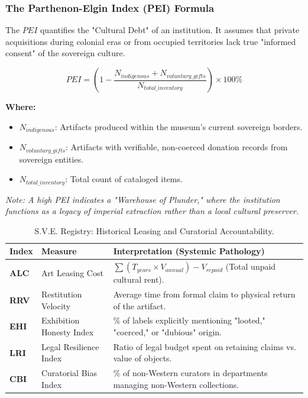\documentclass[11pt,a4paper]{article}
\theoremstyle{definition}
\theoremstyle{remark}
\begin{document}
\subsubsection*{The Parthenon-Elgin Index (PEI) Formula}

The $PEI$ quantifies the "Cultural Debt" of an institution. It assumes that private acquisitions during colonial eras or from occupied territories lack true "informed consent" of the sovereign culture.

\begin{equation}
PEI = \left( 1 - \frac{N_{indigenous} + N_{voluntary\_gifts}}{N_{total\_inventory}} \right) \times 100\%
\end{equation}

\textbf{Where:}
\begin{itemize}
    \item $N_{indigenous}$: Artifacts produced within the museum's current sovereign borders.
    \item $N_{voluntary\_gifts}$: Artifacts with verifiable, non-coerced donation records from sovereign entities.
    \item $N_{total\_inventory}$: Total count of cataloged items.
\end{itemize}

\textit{Note: A high PEI indicates a "Warehouse of Plunder," where the institution functions as a legacy of imperial extraction rather than a local cultural preserver.}


\begin{table}[h!]
\centering
\small
\begin{tabular}{|l|l|l|}
\hline
\textbf{Index} & \textbf{Measure} & \textbf{Interpretation (Systemic Pathology)} \\ \hline
\textbf{ALC} & Art Leasing Cost & $\sum (T_{years} \times V_{annual}) - V_{repaid}$ (Total unpaid cultural rent). \\ \hline
\textbf{RRV} & Restitution Velocity & Average time from formal claim to physical return of the artifact. \\ \hline
\textbf{EHI} & Exhibition Honesty Index & \% of labels explicitly mentioning "looted," "coerced," or "dubious" origin. \\ \hline
\textbf{LRI} & Legal Resilience Index & Ratio of legal budget spent on retaining claims vs. value of objects. \\ \hline
\textbf{CBI} & Curatorial Bias Index & \% of non-Western curators in departments managing non-Western collections. \\ \hline
\end{tabular}
\caption{S.V.E. Registry: Historical Leasing and Curatorial Accountability.}
\end{table}
\end{document}
